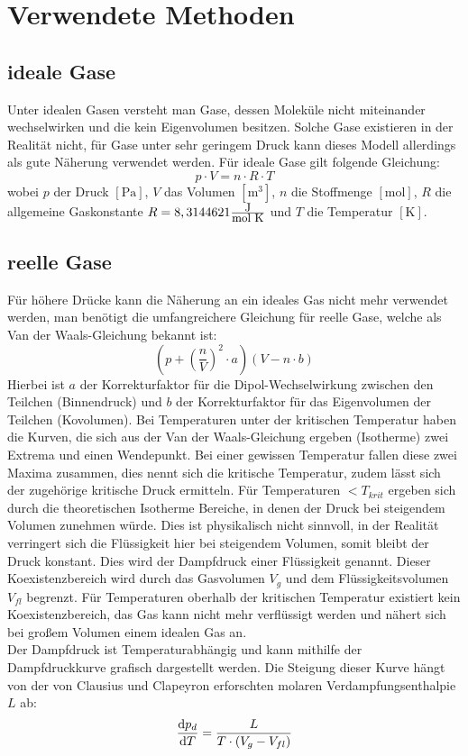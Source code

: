 \section{Verwendete Methoden}
\subsection{ideale Gase}
Unter idealen Gasen versteht man Gase, dessen Moleküle nicht miteinander wechselwirken und die kein Eigenvolumen besitzen. Solche Gase existieren in der Realität nicht, für Gase unter sehr geringem Druck kann dieses Modell allerdings als gute Näherung verwendet werden. Für ideale Gase gilt folgende Gleichung:
\begin{equation}
p \cdot V = n \cdot R \cdot T
\end{equation}
wobei $p$ der Druck $[\mathrm{Pa}]$, $V$ das Volumen $[\mathrm{m^3}]$, $n$ die Stoffmenge $[\mathrm{mol}]$, $R$ die allgemeine Gaskonstante $R=8,3144621 \frac{\text{\fontsize{9}{1}\selectfont {J}}}{\text{\fontsize{9}{1}\selectfont {mol K}}}$ und $T$ die Temperatur $[\mathrm{K}]$.
\subsection{reelle Gase}
Für höhere Drücke kann die Näherung an ein ideales Gas nicht mehr verwendet werden, man benötigt die umfangreichere Gleichung für reelle Gase, welche als Van der Waals-Gleichung bekannt ist:
\begin{equation}
(p+\left(\frac{n}{V}\right)^2 \cdot a)(V - n \cdot b)
\end{equation}
Hierbei ist $a$ der Korrekturfaktor für die Dipol-Wechselwirkung zwischen den Teilchen (Binnendruck) und $b$ der Korrekturfaktor für das Eigenvolumen der Teilchen (Kovolumen). Bei Temperaturen unter der kritischen Temperatur haben die Kurven, die sich aus der Van der Waals-Gleichung ergeben (Isotherme) zwei Extrema und einen Wendepunkt. Bei einer gewissen Temperatur fallen diese zwei Maxima zusammen, dies nennt sich die kritische Temperatur, zudem lässt sich der zugehörige kritische Druck ermitteln. Für Temperaturen $< T_{krit}$ ergeben sich durch die theoretischen Isotherme Bereiche, in denen der Druck bei steigendem Volumen zunehmen würde. Dies ist physikalisch nicht sinnvoll, in der Realität verringert sich die Flüssigkeit hier bei steigendem Volumen, somit bleibt der Druck konstant. Dies wird der Dampfdruck einer Flüssigkeit genannt. Dieser Koexistenzbereich wird durch das Gasvolumen $V_g$ und dem Flüssigkeitsvolumen $V_{fl}$ begrenzt. Für Temperaturen oberhalb der kritischen Temperatur existiert kein Koexistenzbereich, das Gas kann nicht mehr verflüssigt werden und nähert sich bei großem Volumen einem idealen Gas an.\\
Der Dampfdruck ist Temperaturabhängig und kann mithilfe der Dampfdruckkurve grafisch dargestellt werden. Die Steigung dieser Kurve hängt von der von Clausius und Clapeyron erforschten molaren Verdampfungsenthalpie $L$ ab:
\begin{equation}
\frac{\mathrm{d} p_d}{\mathrm{d} T} = \frac{L}{T \cdot (V_g-V_{fl})} \label{eq:cc}
\end{equation}
